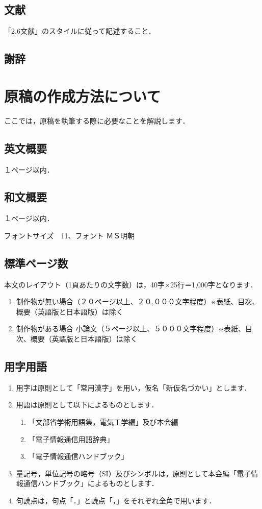 \subsection{文献}
「2.6文献」のスタイルに従って記述すること．

\subsection{謝辞}

\section{原稿の作成方法について}
ここでは，原稿を執筆する際に必要なことを解説します．

\subsection{英文概要}
１ページ以内．

\subsection{和文概要}
１ページ以内．

フォントサイズ　11、フォント ＭＳ明朝

\subsection{標準ページ数}
本文のレイアウト（1頁あたりの文字数）は，40字×25行＝1,000字となります．
\begin{enumerate}
  \item{制作物が無い場合（２０ページ以上、２０,０００文字程度）※表紙、目次、概要（英語版と日本語版）は除く}
  \item{制作物がある場合 小論文（５ページ以上、５０００文字程度）※表紙、目次、概要（英語版と日本語版）は除く}
\end{enumerate}
  
\subsection{用字用語}
\begin{enumerate}
  \item{用字は原則として「常用漢字」を用い，仮名「新仮名づかい」とします．}
  \item{用語は原則として以下によるものとします．}
  \begin{enumerate}
    \item{「文部省学術用語集，電気工学編」及び本会編}
    \item{「電子情報通信用語辞典」}
    \item{「電子情報通信ハンドブック」}
  \end{enumerate}
  \item{量記号，単位記号の略号（SI）及びシンボルは，原則として本会編「電子情報通信ハンドブック」によるものとします．}
  \item{句読点は，句点「．」と読点「，」をそれぞれ全角で用います．}
\end{enumerate}

